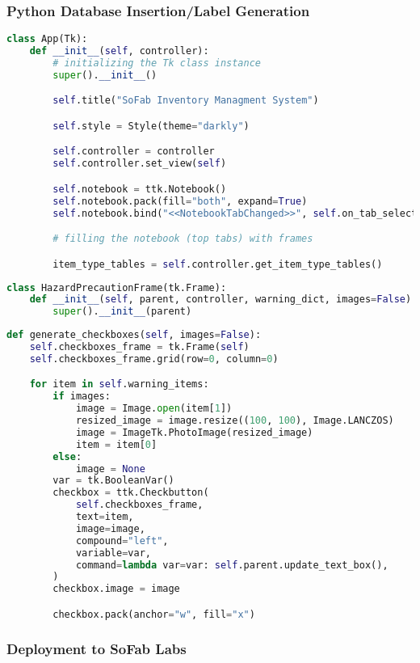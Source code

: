 \documentclass{article}
\begin{document}
\subsubsection{Python Database Insertion\slash Label Generation}
\begin{lstlisting}[language=Python]
class App(Tk):
    def __init__(self, controller):
        # initializing the Tk class instance
        super().__init__()

        self.title("SoFab Inventory Managment System")

        self.style = Style(theme="darkly")

        self.controller = controller
        self.controller.set_view(self)

        self.notebook = ttk.Notebook()
        self.notebook.pack(fill="both", expand=True)
        self.notebook.bind("<<NotebookTabChanged>>", self.on_tab_selection)

        # filling the notebook (top tabs) with frames

        item_type_tables = self.controller.get_item_type_tables()
\end{lstlisting}
\begin{lstlisting}[language=Python]
class HazardPrecautionFrame(tk.Frame):
    def __init__(self, parent, controller, warning_dict, images=False):
        super().__init__(parent)
\end{lstlisting}
\begin{lstlisting}[language=Python]
def generate_checkboxes(self, images=False):
    self.checkboxes_frame = tk.Frame(self)
    self.checkboxes_frame.grid(row=0, column=0)

    for item in self.warning_items:
        if images:
            image = Image.open(item[1])
            resized_image = image.resize((100, 100), Image.LANCZOS)
            image = ImageTk.PhotoImage(resized_image)
            item = item[0]
        else:
            image = None
        var = tk.BooleanVar()
        checkbox = ttk.Checkbutton(
            self.checkboxes_frame,
            text=item,
            image=image,
            compound="left",
            variable=var,
            command=lambda var=var: self.parent.update_text_box(),
        )
        checkbox.image = image

        checkbox.pack(anchor="w", fill="x")
\end{lstlisting}

\subsubsection{Deployment to SoFab Labs}
\end{document}
